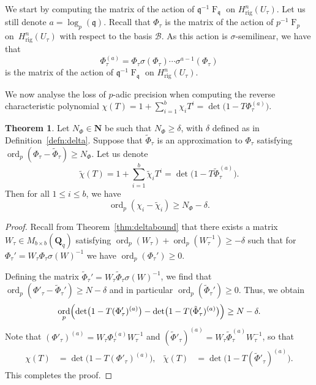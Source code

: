 \documentclass[a4paper,11pt]{article}
\numberwithin{equation}{section}
\newcommand{\NN}{\mathbf{N}} %
\newcommand{\QQ}{\mathbf{Q}} %
\DeclareMathOperator{\ord}{ord}          %
\DeclareMathOperator{\Frob}{F}           %
\providecommand{\Hrig}{H_{\text{rig}}}  %
\providecommand{\cB}{\mathcal{B}} %
\theoremstyle{definition}
\newtheorem{thm}{Theorem}[section]
\begin{document}
We start by computing the matrix of the action 
of $\mathfrak{q}^{-1} \Frob_{\mathfrak{q}}$ on $\Hrig^n(U_{\tau})$. 
Let us still denote $a=\log_p(\mathfrak{q})$. Recall that $\Phi_{\tau}$ 
is the matrix of the action of $p^{-1} \Frob_p$ on~$\Hrig^{n}(U_{\tau})$ 
with respect to the basis $\cB$. As this action is $\sigma$-semilinear, 
we have that 
\begin{equation*}
\Phi_{\tau}^{(a)} = 
    \Phi_{\tau} \sigma(\Phi_{\tau}) \dotsm \sigma^{a-1}(\Phi_{\tau})
\end{equation*}
is the matrix of the action of $\mathfrak{q}^{-1} \Frob_{\mathfrak{q}}$ 
on $\Hrig^n(U_{\tau})$. 

We now analyse the loss of $p$-adic precision when computing 
the reverse characteristic polynomial 
$\chi(T)=1+\sum_{i=1}^b \chi_i T^i=\det\bigl( 1 - T \Phi_{\tau}^{(a)}\bigr)$.

\begin{thm} \label{thm:preccharpoly}
Let $N_{\Phi} \in \NN$ be such that $N_{\Phi} \geq \delta$, 
with $\delta$ defined as in Definition~\ref{defn:delta}.
Suppose that $\tilde{\Phi}_{\tau}$ is an approximation to $\Phi_{\tau}$ satisfying
$\ord_p (\Phi_{\tau}-\tilde{\Phi}_{\tau}) \geq N_{\Phi}$.
Let us denote
\[
\tilde{\chi}(T) = 1 + \sum_{i=1}^b \tilde{\chi}_i T^i 
                = \det\bigl( 1 - T \tilde{\Phi}_{\tau}^{(a)}\bigr).
\]
Then for all $1 \leq i \leq b$, we have
\[
\ord_p (\chi_i - \tilde{\chi}_i) \geq N_{\Phi}-\delta.
\]
\end{thm}

\begin{proof} 
Recall from Theorem~\ref{thm:deltabound} that there exists a matrix 
$W_{\tau} \in M_{b \times b}(\QQ_q)$ satisfying 
$\ord_p(W_{\tau})+\ord_p(W_{\tau}^{-1}) \geq -\delta$ such that for 
$\Phi_{\tau}'=W_{\tau} \Phi_{\tau} \sigma(W)^{-1}$ 
we have \mbox{$\ord_p(\Phi_{\tau}') \geq 0$}.

Defining the matrix 
$\tilde{\Phi}_{\tau}'=W_{\tau} \tilde{\Phi}_{\tau} \sigma(W)^{-1}$, we find that 
$\ord_p(\Phi'_{\tau}-\tilde{\Phi}_{\tau}') \geq N-\delta$ and in particular
$\ord_p(\tilde{\Phi}_{\tau}') \geq 0$. Thus, we obtain
\[
\ord_p \Bigl( \det\bigl(1 - T (\Phi'_{\tau})^{(a)}\bigr) 
            - \det\bigl(1 - T (\tilde{\Phi}'_{\tau})^{(a)}\bigr) \Bigr) \geq N-\delta.
\] 
Note that $(\Phi'_{\tau})^{(a)}= W_{\tau} \Phi_{\tau}^{(a)} W_{\tau}^{-1}$
and $(\tilde{\Phi}'_{\tau})^{(a)}= W_{\tau} \tilde{\Phi}_{\tau}^{(a)} W_{\tau}^{-1}$, 
so that
\begin{align*}
\chi(T) &= \det\bigl(1 - T (\Phi'_{\tau})^{(a)}\bigr),
&\tilde{\chi}(T) &= \det\bigl(1 - T (\tilde{\Phi}'_{\tau})^{(a)}\bigr).
\end{align*}
This completes the proof.
\end{proof}
\end{document}
